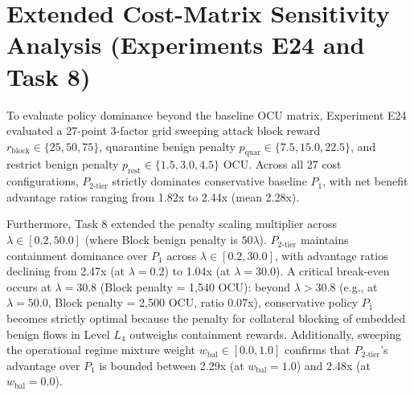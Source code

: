 \section{Extended Cost-Matrix Sensitivity Analysis (Experiments E24 and Task 8)}
\label{app:cost_extension}

To evaluate policy dominance beyond the baseline OCU matrix, Experiment E24 evaluated a 27-point 3-factor grid sweeping attack block reward $r_{\text{block}} \in \{25, 50, 75\}$, quarantine benign penalty $p_{\text{quar}} \in \{7.5, 15.0, 22.5\}$, and restrict benign penalty $p_{\text{rest}} \in \{1.5, 3.0, 4.5\}$ OCU. Across all 27 cost configurations, $P_{2\text{-tier}}$ strictly dominates conservative baseline $P_1$, with net benefit advantage ratios ranging from 1.82x to 2.44x (mean 2.28x).

Furthermore, Task 8 extended the penalty scaling multiplier across $\lambda \in [0.2, 50.0]$ (where Block benign penalty is $50\lambda$). $P_{2\text{-tier}}$ maintains containment dominance over $P_1$ across $\lambda \in [0.2, 30.0]$, with advantage ratios declining from 2.47x (at $\lambda=0.2$) to 1.04x (at $\lambda=30.0$). A critical break-even occurs at $\lambda = 30.8$ (Block penalty = 1,540 OCU): beyond $\lambda > 30.8$ (e.g., at $\lambda = 50.0$, Block penalty = 2,500 OCU, ratio 0.07x), conservative policy $P_1$ becomes strictly optimal because the penalty for collateral blocking of embedded benign flows in Level $L_4$ outweighs containment rewards. Additionally, sweeping the operational regime mixture weight $w_{\text{bal}} \in [0.0, 1.0]$ confirms that $P_{2\text{-tier}}$'s advantage over $P_1$ is bounded between 2.29x (at $w_{\text{bal}} = 1.0$) and 2.48x (at $w_{\text{bal}} = 0.0$).
